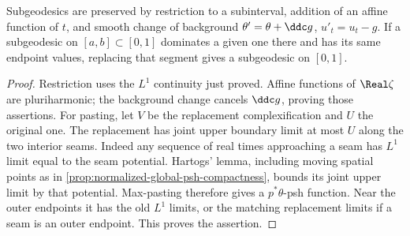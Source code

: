 \begin{lemma}\label{lem:subgeodesic-operations-and-pasting}
Subgeodesics are preserved by restriction to a subinterval, addition of an affine function of $t$, and smooth change of background $\theta'=\theta+\ddc g$, $u'_t=u_t-g$. If a subgeodesic on $[a,b]\subset[0,1]$ dominates a given one there and has its same endpoint values, replacing that segment gives a subgeodesic on $[0,1]$.
\end{lemma}
\begin{proof}
Restriction uses the $L^1$ continuity just proved. Affine functions of $\Real\zeta$ are pluriharmonic; the background change cancels $\ddc g$, proving those assertions. For pasting, let $V$ be the replacement complexification and $U$ the original one. The replacement has joint upper boundary limit at most $U$ along the two interior seams. Indeed any sequence of real times approaching a seam has $L^1$ limit equal to the seam potential. Hartogs' lemma, including moving spatial points as in \cref{prop:normalized-global-psh-compactness}, bounds its joint upper limit by that potential. Max-pasting therefore gives a $p^*\theta$-psh function. Near the outer endpoints it has the old $L^1$ limits, or the matching replacement limits if a seam is an outer endpoint. This proves the assertion.
\end{proof}

